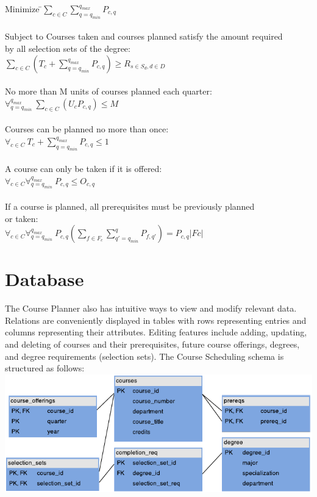 \documentclass[a4paper,12pt]{article}
\begin{document}
\begin{tabbing}
\indent Minimize
\indent\=$\sum\limits_{c \in C} \sum\limits_{q=q_{min}}^{q_{max}} P_{c,q}$\\\\
\indent Subject to
\>Courses taken and courses planned satisfy the amount required\\\> by all selection sets of the degree:\\
\>$\sum\limits_{c\in C} (T_c + \sum\limits_{q=q_{min}}^{q_{max}} P_{c,q} ) \geq R_{s\in S_d,d\in D}$\\\\
\>No more than M units of courses planned each quarter:\\
\>$\forall_{q=q_{min}}^{q_{max}}\ \sum_{c\in C} (U_c P_{c,q}) \leq M$\\\\
\>Courses can be planned no more than once:\\
\>$\forall_{c \in C}\ T_c + \sum\limits_{q=q_{min}}^{q_{max}} P_{c,q} \leq 1$\\\\
\>A course can only be taken if it is offered:\\
\>$\forall_{c \in C} \forall_{q=q_{min}}^{q_{max}}\ P_{c,q} \leq O_{c,q}$\\\\
\>If a course is planned, all prerequisites must be previously planned\\\> or taken:\\
\>$\forall_{c \in C} \forall_{q=q_{min}}^{q_{max}}\ P_{c,q} (\sum\limits_{f \in F_c} \sum\limits_{q'=q_{min}}^{q} P_{f,q'}) = P_{c,q}|Fc|$\\

\end{tabbing}
\pagebreak
\section{Database}
The Course Planner also has intuitive ways to view and modify relevant data. Relations are conveniently displayed in tables with rows representing entries and columns representing their attributes. Editing features include adding, updating, and deleting of courses and their prerequisites, future course offerings, degrees, and degree requirements (selection sets). The Course Scheduling schema is structured as follows:\\

\noindent \includegraphics[width=1\textwidth]{CoursePlannerSchema.pdf}\\
\end{document}
